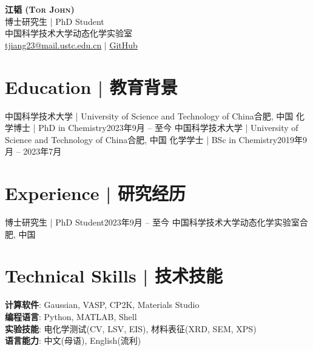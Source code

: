 \documentclass[letterpaper,11pt]{article}
\begin{document}
\begin{center}
    \textbf{\Huge \scshape 江韬 (Tor John)} \\ \vspace{1pt}
    \small 博士研究生 | PhD Student \\ \vspace{1pt}
    \small 中国科学技术大学动态化学实验室 \\ \vspace{1pt}
    \href{mailto:tjiang23@mail.ustc.edu.cn}{\underline{tjiang23@mail.ustc.edu.cn}} $|$ 
    \href{https://github.com/Tenor-John}{\underline{GitHub}}
\end{center}

\section{Education | 教育背景}
  \resumeSubHeadingListStart
    \resumeSubheading
      {中国科学技术大学 | University of Science and Technology of China}{合肥, 中国}
      {化学博士 | PhD in Chemistry}{2023年9月 -- 至今}
      \resumeItemListStart
      \resumeItemListEnd
    \resumeSubheading
      {中国科学技术大学 | University of Science and Technology of China}{合肥, 中国}
      {化学学士 | BSc in Chemistry}{2019年9月 -- 2023年7月}
      \resumeItemListStart
      \resumeItemListEnd
  \resumeSubHeadingListEnd

\section{Experience | 研究经历}
  \resumeSubHeadingListStart
    \resumeSubheading
      {博士研究生 | PhD Student}{2023年9月 -- 至今}
      {中国科学技术大学动态化学实验室}{合肥, 中国}
      \resumeItemListStart
      \resumeItemListEnd

\section{Technical Skills | 技术技能}
 \begin{itemize}[leftmargin=0.15in, label={}]
    \small{\item{
     \textbf{计算软件}{: Gaussian, VASP, CP2K, Materials Studio} \\
     \textbf{编程语言}{: Python, MATLAB, Shell} \\
     \textbf{实验技能}{: 电化学测试(CV, LSV, EIS), 材料表征(XRD, SEM, XPS)} \\
     \textbf{语言能力}{: 中文(母语), English(流利)}
    }}
 \end{itemize}
\end{document}
